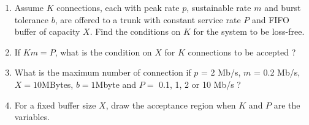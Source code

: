 \begin{problem}
\begin{enumerate}
    \item Assume $K$ connections, each with peak rate $p$, sustainable rate
    $m$ and burst tolerance $b$, are offered to a trunk with constant
    service rate $P$ and FIFO buffer of capacity $X$. Find the
    conditions on $K$ for the system to be loss-free.
    \item If $Km =P$, what is the condition on $X$ for $K$
    connections to be accepted ?
    \item What is the maximum number of connection if $p$ = 2 Mb/s,
    $m$ = 0.2 Mb/s, $X= 10 $MBytes, $b=1 $Mbyte and $P=$ 0.1, 1, 2 or
    10 Mb/s ?
    \item For a fixed buffer size $X$, draw the acceptance
    region when $K$ and $P$ are the variables.
\end{enumerate}
\end{problem}
